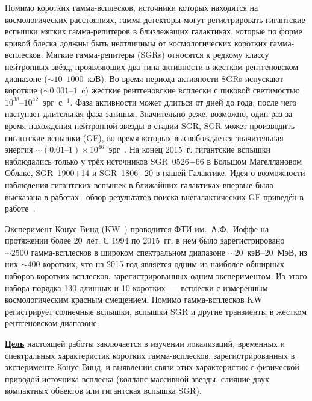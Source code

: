 Помимо коротких гамма-всплесков, источники которых находятся на космологических расстояниях,
гамма-детекторы могут регистрировать гигантские вспышки мягких гамма-репитеров 
в близлежащих галактиках, которые по форме кривой блеска должны быть неотличимы от 
космологических коротких гамма-всплесков. Мягкие гамма-репитеры (SGRs) относятся 
к редкому классу нейтронных звёзд, проявляющих 
два типа активности в жестком рентгеновском диапазоне ($\sim 10\textrm{--}1000$~кэВ). 
Во время периода активности SGRs испускают короткие ($\sim0.001\textrm{--}1$~c) жесткие рентгеновские всплески 
с пиковой светимостью $10^{38}\textrm{--}10^{42}$~эрг~с$^{-1}$. Фаза активности может длиться 
от дней до года, после чего наступает длительная фаза затишья. Значительно реже, 
возможно, один раз за время нахождения нейтронной звезды в стадии SGR, SGR может 
производить гигантские вспышки (GF), во время которых высвобождается значительная 
энергия $\sim(0.01\textrm{--}1)\times 10^{46}$~эрг~\citep[см. обзор][]{Mereghetti2013}.
На конец 2015~г. гигантские вспышки наблюдались только у трёх источников 
SGR~0526$-$66 в Большом Магеллановом Облаке, SGR~1900$+$14 и SGR~1806$-$20 в нашей Галактике.
Идея о возможности наблюдения гигантских вспышек в ближайших галактиках впервые была высказана 
в работах~\citep{Mazets1981,Mazets1982} обзор результатов поиска 
внегалактических GF приведён в работе~\citep{Hurley2011}.

Эксперимент Конус-Винд (KW~\citep{Aptekar_1995SSR}) проводится ФТИ им.~А.Ф.~Иоффе 
на протяжении более 20~лет. С 1994 по 2015~гг. в нем  было зарегистрировано 
$\sim 2500$ гамма-всплесков в широком спектральном диапазоне $\sim 20$~кэВ--20~МэВ,
из них $\sim 400$ коротких, что на 2015 год является 
одним из наиболее обширных наборов коротких всплесков, зарегистрированных 
одним экспериментом. Из этого набора порядка 130 длинных и 10 коротких~--- всплески 
с измеренным космологическим красным смещением. 
Помимо гамма-всплесков KW регистрирует солнечные вспышки, вспышки SGR 
и другие транзиенты в жестком рентгеновском диапазоне.

\underline{\textbf{Цель}} настоящей работы заключается в изучении локализаций, 
временных и спектральных характеристик коротких гамма-всплесков, 
зарегистрированных в эксперименте Конус-Винд, и выявлении 
связи этих характеристик с физической природой источника всплеска 
(коллапс массивной звезды, слияние двух компактных объектов или гигантская вспышка SGR).

